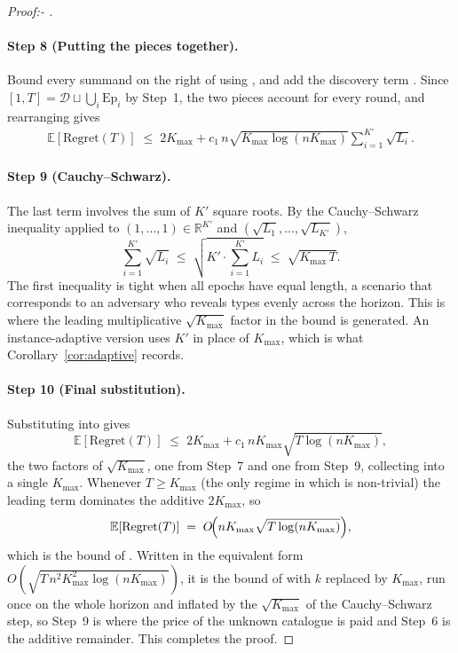 \documentclass[letterpaper,9pt,twocolumn]{extarticle}
\newcommand{\EE}{\mathbb{E}}
\newcommand{\RR}{\mathbb{R}}
\newcommand{\Kmax}{K_{\max}}
\newcommand{\Regret}{\mathrm{Regret}}
\theoremstyle{plain}
\theoremstyle{definition}
\theoremstyle{remark}
\begin{document}
\begin{proof}[Proof:- ]
\paragraph{Step 8 (Putting the pieces together).}
Bound every summand on the right of  using
, and add the discovery term . Since
$[1,T]=\mathcal{D}\sqcup\bigcup_i\mathrm{Ep}_i$ by Step~1, the two pieces
account for every round, and rearranging gives
\begin{align}
\EE[\Regret(T)]\;\le\;2\Kmax+c_1\,n\sqrt{\Kmax\log (n\Kmax)}\!\sum_{i=1}^{K'}\!\sqrt{L_i}.
\label{eq:after-sum}
\end{align}

\paragraph{Step 9 (Cauchy--Schwarz).}
The last term involves the sum of $K'$ square roots. By the Cauchy--Schwarz
inequality applied to $(1,\dots,1)\in\RR^{K'}$ and
$(\sqrt{L_1},\dots,\sqrt{L_{K'}})$,
\begin{equation}
\sum_{i=1}^{K'}\!\sqrt{L_i}\;\le\;\sqrt{K'\cdot\!\sum_{i=1}^{K'}\!L_i}\;\le\;\sqrt{\Kmax\,T}.
\label{eq:CS}
\end{equation}
The first inequality is tight when all epochs have equal length, a
scenario that corresponds to an adversary who reveals types evenly across
the horizon. This is where the leading multiplicative $\sqrt{\Kmax}$
factor in the bound is generated. An instance-adaptive version uses $K'$
in place of $\Kmax$, which is what Corollary~\ref{cor:adaptive} records.

\paragraph{Step 10 (Final substitution).}
Substituting  into  gives
\[
\EE[\Regret(T)]\;\le\;2\Kmax+c_1\,n\Kmax\sqrt{T\log (n\Kmax)},
\]
the two factors of $\sqrt{\Kmax}$, one from Step~7 and one from Step~9,
collecting into a single $\Kmax$. Whenever $T\ge\Kmax$ (the only regime in
which  is non-trivial) the leading term dominates the
additive $2\Kmax$, so
\[
\EE[\Regret(T)]\;=\;O\!\Bigl(n\Kmax\sqrt{T\log(n\Kmax)}\Bigr),
\]
which is the bound of . Written in the equivalent form
$O(\sqrt{T\,n^2\Kmax^2\log(n\Kmax)})$, it is the bound of
\citet[Theorem 5.1]{balcan2015} with $k$ replaced by $\Kmax$, run once on
the whole horizon and inflated by the $\sqrt{\Kmax}$ of the Cauchy--Schwarz
step, so Step~9 is where the price of the unknown catalogue is paid and
Step~6 is the additive remainder. This
completes the proof.
\end{proof}
\end{document}
